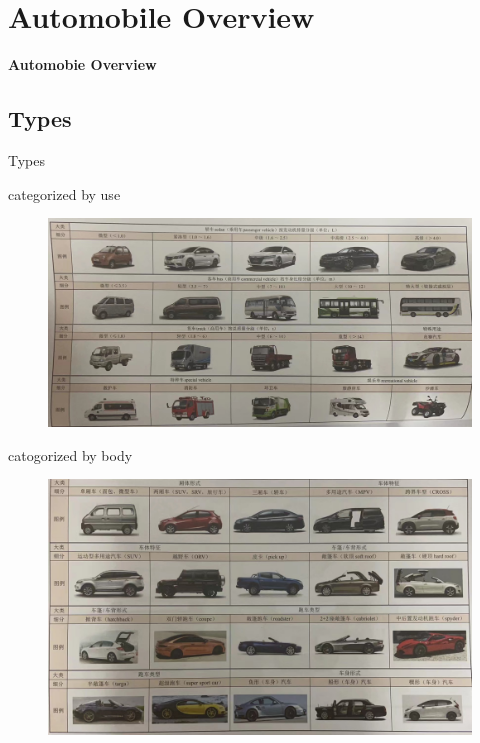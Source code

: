 
\graphicspath{{../img/}}

\abovedisplayshortskip=0pt	%
\belowdisplayshortskip=0pt
\abovedisplayskip=0pt	%
\belowdisplayskip=0pt

\section{Automobile Overview}
\begin{frame}
	\centering\Huge\textbf{Automobie Overview}
\end{frame}
\subsection{Types}
\begin{frame}{Types}	%
	\begin{block}{categorized by use} %
		\begin{figure}[htbp]
			\centering
			\includegraphics[width=1\textwidth]{1-1}
		\end{figure}
	\end{block}
\end{frame}
\begin{frame}	%
	\begin{block}{catogorized by body}
		\begin{figure}[htbp]
			\centering
			\includegraphics[width=1\textwidth]{1-2}
		\end{figure}
	\end{block}
\end{frame}
